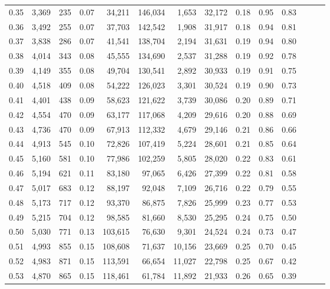 \begin{tabular}{rrrrrrrrrrrrrr}
0.35 &  3,369 &  235 &  0.07 &   34,211 &  146,034 &   1,653 &  32,172 &  0.18 &  0.95 &      0.83 \\
0.36 &  3,492 &  255 &  0.07 &   37,703 &  142,542 &   1,908 &  31,917 &  0.18 &  0.94 &      0.81 \\
0.37 &  3,838 &  286 &  0.07 &   41,541 &  138,704 &   2,194 &  31,631 &  0.19 &  0.94 &      0.80 \\
0.38 &  4,014 &  343 &  0.08 &   45,555 &  134,690 &   2,537 &  31,288 &  0.19 &  0.92 &      0.78 \\
0.39 &  4,149 &  355 &  0.08 &   49,704 &  130,541 &   2,892 &  30,933 &  0.19 &  0.91 &      0.75 \\
0.40 &  4,518 &  409 &  0.08 &   54,222 &  126,023 &   3,301 &  30,524 &  0.19 &  0.90 &      0.73 \\
0.41 &  4,401 &  438 &  0.09 &   58,623 &  121,622 &   3,739 &  30,086 &  0.20 &  0.89 &      0.71 \\
0.42 &  4,554 &  470 &  0.09 &   63,177 &  117,068 &   4,209 &  29,616 &  0.20 &  0.88 &      0.69 \\
0.43 &  4,736 &  470 &  0.09 &   67,913 &  112,332 &   4,679 &  29,146 &  0.21 &  0.86 &      0.66 \\
0.44 &  4,913 &  545 &  0.10 &   72,826 &  107,419 &   5,224 &  28,601 &  0.21 &  0.85 &      0.64 \\
0.45 &  5,160 &  581 &  0.10 &   77,986 &  102,259 &   5,805 &  28,020 &  0.22 &  0.83 &      0.61 \\
0.46 &  5,194 &  621 &  0.11 &   83,180 &   97,065 &   6,426 &  27,399 &  0.22 &  0.81 &      0.58 \\
0.47 &  5,017 &  683 &  0.12 &   88,197 &   92,048 &   7,109 &  26,716 &  0.22 &  0.79 &      0.55 \\
0.48 &  5,173 &  717 &  0.12 &   93,370 &   86,875 &   7,826 &  25,999 &  0.23 &  0.77 &      0.53 \\
0.49 &  5,215 &  704 &  0.12 &   98,585 &   81,660 &   8,530 &  25,295 &  0.24 &  0.75 &      0.50 \\
0.50 &  5,030 &  771 &  0.13 &  103,615 &   76,630 &   9,301 &  24,524 &  0.24 &  0.73 &      0.47 \\
0.51 &  4,993 &  855 &  0.15 &  108,608 &   71,637 &  10,156 &  23,669 &  0.25 &  0.70 &      0.45 \\
0.52 &  4,983 &  871 &  0.15 &  113,591 &   66,654 &  11,027 &  22,798 &  0.25 &  0.67 &      0.42 \\
0.53 &  4,870 &  865 &  0.15 &  118,461 &   61,784 &  11,892 &  21,933 &  0.26 &  0.65 &      0.39 \\

\end{tabular}
